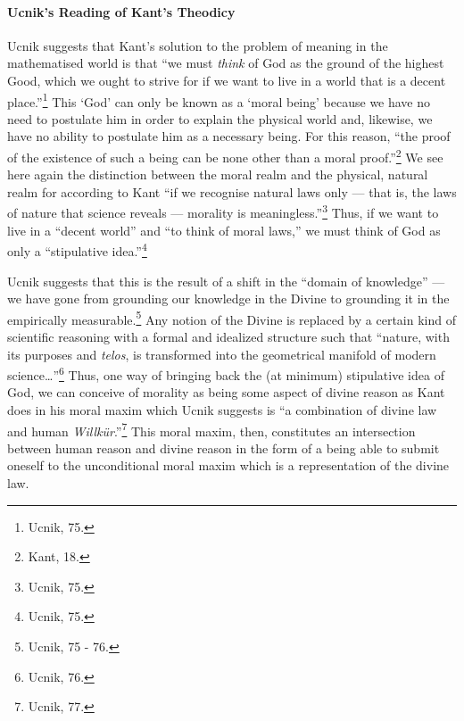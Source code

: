 \documentclass[12pt]{article}
\begin{document}
	\paragraph*{Ucnik's Reading of Kant's Theodicy}  Ucnik suggests that Kant's solution to the problem of meaning in the mathematised world is that ``we must \emph{think} of God as the ground of the highest Good, which we ought to strive for if we want to live in a world that is a decent place.''\footnote{Ucnik, 75.} This `God' can only be known as a `moral being' because we have no need to postulate him in order to explain the physical world and, likewise, we have no ability to postulate him as a necessary being. For this reason, ``the proof of the existence of such a being can be none other than a moral proof.''\footnote{Kant, 18.} We see here again the distinction between the moral realm and the physical, natural realm for according to Kant ``if we recognise natural laws only --- that is, the laws of nature that science reveals --- morality is meaningless.''\footnote{Ucnik, 75.} Thus, if we want to live in a ``decent world'' and ``to think of moral laws,'' we must think of God as only a ``stipulative idea.''\footnote{Ucnik, 75.} 
	
	Ucnik suggests that this is the result of a shift in the ``domain of knowledge'' --- we have gone from grounding our knowledge in the Divine to grounding it in the empirically measurable.\footnote{Ucnik, 75 - 76.} Any notion of the Divine is replaced by a certain kind of scientific reasoning with a formal and idealized structure such that ``nature, with its purposes and \emph{telos}, is transformed into the geometrical manifold of modern science\ldots''\footnote{Ucnik, 76.} Thus, one way of bringing back the (at minimum) stipulative idea of God, we can conceive of morality as being some aspect of divine reason as Kant does in his moral maxim which Ucnik suggests is ``a combination of divine law and human \emph{Willk\"{u}r}.''\footnote{Ucnik, 77.} This moral maxim, then, constitutes an intersection between human reason and divine reason in the form of a being able to submit oneself to the unconditional moral maxim which is a representation of the divine law. 
	
\end{document}
